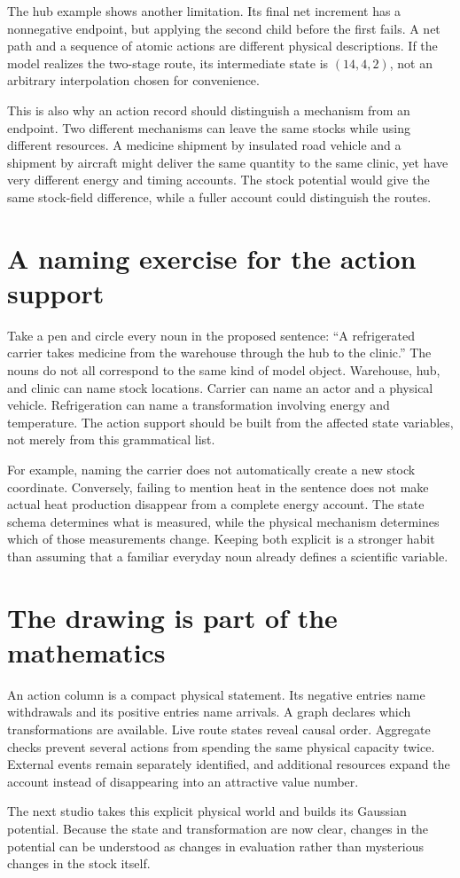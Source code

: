 The hub example shows another limitation. Its final net increment has a nonnegative endpoint, but applying the second child before the first fails. A net path and a sequence of atomic actions are different physical descriptions. If the model realizes the two-stage route, its intermediate state is \((14,4,2)\), not an arbitrary interpolation chosen for convenience.

This is also why an action record should distinguish a mechanism from an endpoint. Two different mechanisms can leave the same stocks while using different resources. A medicine shipment by insulated road vehicle and a shipment by aircraft might deliver the same quantity to the same clinic, yet have very different energy and timing accounts. The stock potential would give the same stock-field difference, while a fuller account could distinguish the routes.

\section{A naming exercise for the action support}

Take a pen and circle every noun in the proposed sentence: ``A refrigerated carrier takes medicine from the warehouse through the hub to the clinic.'' The nouns do not all correspond to the same kind of model object. Warehouse, hub, and clinic can name stock locations. Carrier can name an actor and a physical vehicle. Refrigeration can name a transformation involving energy and temperature. The action support should be built from the affected state variables, not merely from this grammatical list.

For example, naming the carrier does not automatically create a new stock coordinate. Conversely, failing to mention heat in the sentence does not make actual heat production disappear from a complete energy account. The state schema determines what is measured, while the physical mechanism determines which of those measurements change. Keeping both explicit is a stronger habit than assuming that a familiar everyday noun already defines a scientific variable.

\section{The drawing is part of the mathematics}

An action column is a compact physical statement. Its negative entries name withdrawals and its positive entries name arrivals. A graph declares which transformations are available. Live route states reveal causal order. Aggregate checks prevent several actions from spending the same physical capacity twice. External events remain separately identified, and additional resources expand the account instead of disappearing into an attractive value number.

The next studio takes this explicit physical world and builds its Gaussian potential. Because the state and transformation are now clear, changes in the potential can be understood as changes in evaluation rather than mysterious changes in the stock itself.
